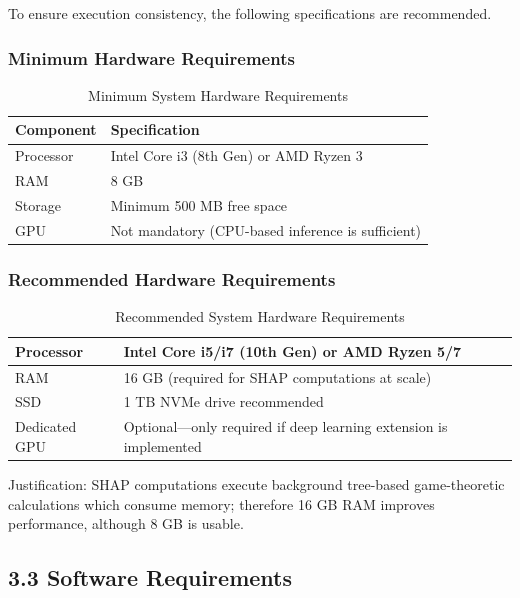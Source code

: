 \documentclass[12pt, a4paper]{article}
\begin{document}
To ensure execution consistency, the following specifications are recommended.

\subsubsection{\textbf{Minimum Hardware Requirements}}

\begin{table}[H]
\centering
\begin{tabular}{|p{4cm}|p{8cm}|}
\hline
\textbf{Component} & \textbf{Specification} \\ \hline
Processor & Intel Core i3 (8th Gen) or AMD Ryzen 3 \\ \hline
RAM & 8 GB \\ \hline
Storage & Minimum 500 MB free space \\ \hline
GPU & Not mandatory (CPU-based inference is sufficient) \\ \hline
\end{tabular}
\caption{Minimum System Hardware Requirements}
\end{table}

\subsubsection{\textbf{Recommended Hardware Requirements}}

\begin{table}[H]
\centering
\begin{tabular}{|p{4cm}|p{8cm}|}
\hline
Processor & Intel Core i5/i7 (10th Gen) or AMD Ryzen 5/7 \\ \hline
RAM & 16 GB (required for SHAP computations at scale) \\ \hline
SSD & 1 TB NVMe drive recommended \\ \hline
Dedicated GPU & Optional—only required if deep learning extension is implemented \\ \hline
\end{tabular}
\caption{Recommended System Hardware Requirements}
\end{table}

\noindent
Justification: SHAP computations execute background tree-based game-theoretic calculations which consume memory; therefore 16 GB RAM improves performance, although 8 GB is usable.

\subsection{\textbf{3.3 Software Requirements}}
\end{document}
